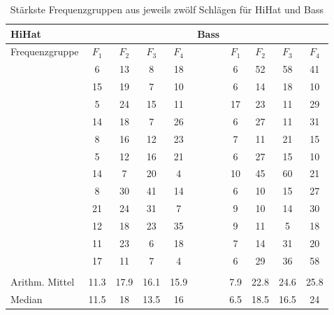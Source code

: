\begin{table}[H]
	\centering
	\caption{Stärkste Frequenzgruppen aus jeweils zwölf Schlägen für HiHat und Bass}
	\begin{tabular}{l c c c c | l c c c c}
		HiHat &&&& &Bass \\
		\hline
		Frequenzgruppe & $F_1$ & $F_2$ & $F_3$ & $F_4$  & & $F_1$ & $F_2$ & $F_3$ & $F_4$\\	
		
        & 6	 & 13  & 8  & 18 && 6  & 52 &	58 & 41\\
        & 15 &	19 & 7  & 10 && 6  & 14 &	18 & 10\\
        & 5  &	24 & 15	& 11 && 17 & 23 &	11 & 29\\
        & 14 &	18 & 7  & 26 && 6  & 27 &	11 & 31\\
        & 8	 &  16 & 12 & 23 && 7  & 11 &	21 & 15\\
        & 5  &	12 & 16 & 21 && 6  & 27 &	15 & 10\\
        & 14 &	7  & 20	& 4  && 10 & 45 &	60 & 21\\
        & 8	 &  30 & 41 & 14 &&  6 & 10 &	15 & 27\\
        & 21 &	24 & 31 & 7  &&  9 & 10 &	14 & 30\\
        & 12 &	18 & 23 & 35 &&  9 & 11 &	5  & 18\\
        & 11 &	23 &  6 & 18 &&  7 & 14 &	31 & 20\\
        & 17 &	11 &  7 &  4 &&  6 & 29 &	36 & 58\\
        		\\
		\hline
		Arithm. Mittel & 11.3 & 17.9 & 16.1 &	15.9  && 7.9 & 22.8 &	24.6 &	25.8\\
		Median       & 11.5 & 18   & 13.5 &	16    && 6.5 & 18.5 &	16.5 &	24\\		 

 
        
%
%
%
%
%
%
		


\end{tabular}
\end{table}
